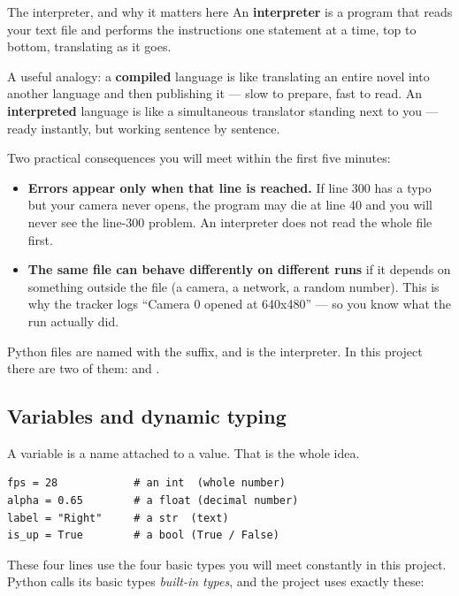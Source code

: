 \begin{pythonconcept}{The interpreter, and why it matters here}
An \textbf{interpreter} is a program that reads your text file and performs the instructions one
statement at a time, top to bottom, translating as it goes.

A useful analogy: a \textbf{compiled} language is like translating an entire novel into another
language and then publishing it --- slow to prepare, fast to read. An \textbf{interpreted} language
is like a simultaneous translator standing next to you --- ready instantly, but working sentence by
sentence.

Two practical consequences you will meet within the first five minutes:

\begin{itemize}
  \item \textbf{Errors appear only when that line is reached.} If line 300 has a typo but your
        camera never opens, the program may die at line 40 and you will never see the line-300
        problem. An interpreter does not read the whole file first.
  \item \textbf{The same file can behave differently on different runs} if it depends on something
        outside the file (a camera, a network, a random number). This is why the tracker logs
        ``Camera 0 opened at 640x480'' --- so you know what the run actually did.
\end{itemize}

Python files are named with the  suffix, and  is the interpreter. In this
project there are two of them:  and .
\end{pythonconcept}

\subsection{Variables and dynamic typing}

A variable is a name attached to a value. That is the whole idea.

\begin{codecard}
\begin{lstlisting}
fps = 28            # an int  (whole number)
alpha = 0.65        # a float (decimal number)
label = "Right"     # a str  (text)
is_up = True        # a bool (True / False)
\end{lstlisting}
\end{codecard}

These four lines use the four basic types you will meet constantly in this project. Python calls
its basic types \emph{built-in types}, and the project uses exactly these:

